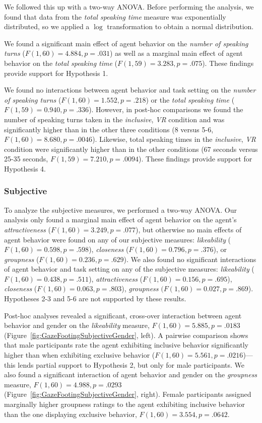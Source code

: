 We followed this up with a two-way ANOVA. Before performing the analysis, we found that data from the \emph{total speaking time} measure was exponentially distributed, so we applied a $\log$ transformation to obtain a normal distribution.

We found a significant main effect of agent behavior on the \emph{number of speaking turns} ($F(1, 60) = 4.884, p = .031$) as well as a marginal main effect of agent behavior on the \emph{total speaking time} ($F(1, 59) = 3.283, p = .075$). These findings provide support for Hypothesis 1.

We found no interactions between agent behavior and task setting on the \emph{number of speaking turns} ($F(1, 60) = 1.552, p = .218$) or the \emph{total speaking time} ($F(1, 59) = 0.940, p = .336$). However, in post-hoc comparisons we found the number of speaking turns taken in the \emph{inclusive}, \emph{VR} condition and was significantly higher than in the other three conditions (8 versus 5-6, $F(1, 60) = 8.680, p = .0046$). Likewise, total speaking times in the \emph{inclusive}, \emph{VR} condition were significantly higher than in the other conditions (67 seconds versus 25-35 seconds, $F(1, 59) = 7.210, p = .0094$). These findings provide support for Hypothesis 4.

\subsubsection{Subjective}

To analyze the subjective measures, we performed a two-way ANOVA. Our analysis only found a marginal main effect of agent behavior on the agent's \emph{attractiveness} ($F(1, 60) = 3.249, p = .077$), but otherwise no main effects of agent behavior were found on any of our subjective measures: \emph{likeability} ($F(1, 60) = 0.598, p = .598$), \emph{closeness} ($F(1, 60) = 0.796, p = .376$), or \emph{groupness} ($F(1, 60) = 0.236, p = .629$). We also found no significant interactions of agent behavior and task setting on any of the subjective measures: \emph{likeability} ($F(1, 60) = 0.438, p = .511$), \emph{attractiveness} ($F(1, 60) = 0.156, p = .695$), \emph{closeness} ($F(1, 60) = 0.063, p = .803$), \emph{groupness} $(F(1, 60) = 0.027, p = .869$). Hypotheses 2-3 and 5-6 are not supported by these results.

Post-hoc analyses revealed a significant, cross-over interaction between agent behavior and gender on the \emph{likeability} measure, $F(1, 60) = 5.885, p = .0183$ (Figure~\ref{fig:GazeFootingSubjectiveGender}, left). A pairwise comparison shows that male participants rate the agent exhibiting inclusive behavior significantly higher than when exhibiting exclusive behavior ($F(1, 60) = 5.561, p = .0216$)---this lends partial support to Hypothesis 2, but only for male participants. We also found a significant interaction of agent behavior and gender on the \emph{groupness} measure, $F(1, 60) = 4.988, p = .0293$ (Figure~\ref{fig:GazeFootingSubjectiveGender}, right). Female participants assigned marginally higher groupness ratings to the agent exhibiting inclusive behavior than the one displaying exclusive behavior, $F(1, 60) = 3.554, p = .0642$.

